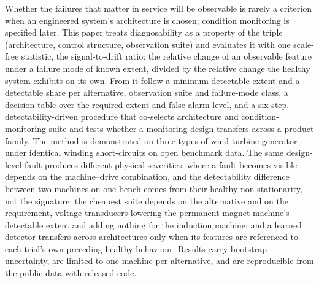 Whether the failures that matter in service will be observable is rarely a criterion when an engineered system's architecture is chosen; condition monitoring is specified later. This paper treats diagnosability as a property of the triple (architecture, control structure, observation suite) and evaluates it with one scale-free statistic, the signal-to-drift ratio: the relative change of an observable feature under a failure mode of known extent, divided by the relative change the healthy system exhibits on its own. From it follow a minimum detectable extent and a detectable share per alternative, observation suite and failure-mode class, a decision table over the required extent and false-alarm level, and a six-step, detectability-driven procedure that co-selects architecture and condition-monitoring suite and tests whether a monitoring design transfers across a product family. The method is demonstrated on three types of wind-turbine generator under identical winding short-circuits on open benchmark data. The same design-level fault produces different physical severities; where a fault becomes visible depends on the machine--drive combination, and the detectability difference between two machines on one bench comes from their healthy non-stationarity, not the signature; the cheapest suite depends on the alternative and on the requirement, voltage transducers lowering the permanent-magnet machine's detectable extent and adding nothing for the induction machine; and a learned detector transfers across architectures only when its features are referenced to each trial's own preceding healthy behaviour. Results carry bootstrap uncertainty, are limited to one machine per alternative, and are reproducible from the public data with released code.
